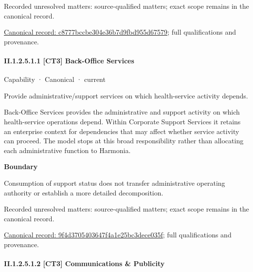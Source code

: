 {\small Recorded unresolved matters: source-qualified matters; exact scope remains in the canonical record.}\par
{\footnotesize \href{../../../../../../../continuum/strategy/capability/c8777bccbe304e36b7d9fbd955d67579.md}{Canonical record: c8777bccbe304e36b7d9fbd955d67579}; full qualifications and provenance.}\par
\paragraph*{II.1.2.5.1.1 [CT3] Back-Office Services}
\label{navigation:II.1.2.5.1.1}

\label{element:9f4d3705403647f4a1e25bc3dece035f}
{\small Capability · Canonical · current}\par

Provide administrative/support services on which health-service activity depends.



Back-Office Services provides the administrative and support activity on which health-service operations depend. Within Corporate Support Services it retains an enterprise context for dependencies that may affect whether service activity can proceed. The model stops at this broad responsibility rather than allocating each administrative function to Harmonia.



\textbf{Boundary}



Consumption of support status does not transfer administrative operating authority or establish a more detailed decomposition.


{\small Recorded unresolved matters: source-qualified matters; exact scope remains in the canonical record.}\par
{\footnotesize \href{../../../../../../../continuum/strategy/capability/9f4d3705403647f4a1e25bc3dece035f.md}{Canonical record: 9f4d3705403647f4a1e25bc3dece035f}; full qualifications and provenance.}\par
\paragraph*{II.1.2.5.1.2 [CT3] Communications \& Publicity}
\label{navigation:II.1.2.5.1.2}

